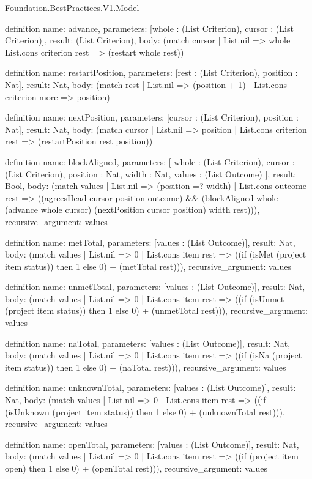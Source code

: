 \begin{lexlean}{Foundation.BestPractices.V1.Model}
\begin{semanticmodule}
definition{
  name: advance,
  parameters: [whole : (List Criterion), cursor : (List Criterion)],
  result: (List Criterion),
  body: (match cursor | List.nil => whole | List.cons criterion rest => (restart whole rest))
}

definition{
  name: restartPosition,
  parameters: [rest : (List Criterion), position : Nat],
  result: Nat,
  body: (match rest | List.nil => (position + 1) | List.cons criterion more => position)
}

definition{
  name: nextPosition,
  parameters: [cursor : (List Criterion), position : Nat],
  result: Nat,
  body: (match cursor
    | List.nil => position
    | List.cons criterion rest => (restartPosition rest position))
}

definition{
  name: blockAligned,
  parameters: [
    whole : (List Criterion),
    cursor : (List Criterion),
    position : Nat,
    width : Nat,
    values : (List Outcome)
  ],
  result: Bool,
  body: (match values
    | List.nil => (position =? width)
    | List.cons outcome rest => ((agreesHead cursor position outcome) && (blockAligned whole (advance whole cursor) (nextPosition cursor position) width rest))),
  recursive_argument: values
}

definition{
  name: metTotal,
  parameters: [values : (List Outcome)],
  result: Nat,
  body: (match values
    | List.nil => 0
    | List.cons item rest => ((if (isMet (project item status)) then 1 else 0) + (metTotal rest))),
  recursive_argument: values
}

definition{
  name: unmetTotal,
  parameters: [values : (List Outcome)],
  result: Nat,
  body: (match values
    | List.nil => 0
    | List.cons item rest => ((if (isUnmet (project item status)) then 1 else 0) + (unmetTotal rest))),
  recursive_argument: values
}

definition{
  name: naTotal,
  parameters: [values : (List Outcome)],
  result: Nat,
  body: (match values
    | List.nil => 0
    | List.cons item rest => ((if (isNa (project item status)) then 1 else 0) + (naTotal rest))),
  recursive_argument: values
}

definition{
  name: unknownTotal,
  parameters: [values : (List Outcome)],
  result: Nat,
  body: (match values
    | List.nil => 0
    | List.cons item rest => ((if (isUnknown (project item status)) then 1 else 0) + (unknownTotal rest))),
  recursive_argument: values
}

definition{
  name: openTotal,
  parameters: [values : (List Outcome)],
  result: Nat,
  body: (match values
    | List.nil => 0
    | List.cons item rest => ((if (project item open) then 1 else 0) + (openTotal rest))),
  recursive_argument: values
}


\end{semanticmodule}
\end{lexlean}
